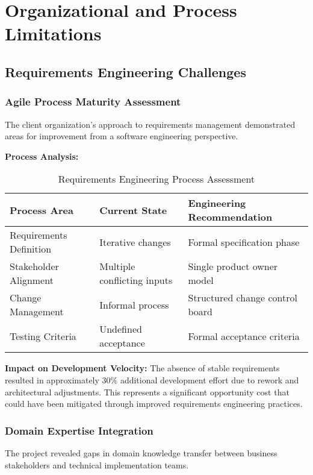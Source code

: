 \section{Organizational and Process Limitations}

\subsection{Requirements Engineering Challenges}

\subsubsection{Agile Process Maturity Assessment}

The client organization's approach to requirements management demonstrated areas for improvement from a software engineering perspective.

\textbf{Process Analysis:}
\begin{table}[h]
\centering
\begin{tabular}{|l|l|l|}
\hline
\textbf{Process Area} & \textbf{Current State} & \textbf{Engineering Recommendation} \\
\hline
Requirements Definition & Iterative changes & Formal specification phase \\
Stakeholder Alignment & Multiple conflicting inputs & Single product owner model \\
Change Management & Informal process & Structured change control board \\
Testing Criteria & Undefined acceptance & Formal acceptance criteria \\
\hline
\end{tabular}
\caption{Requirements Engineering Process Assessment}
\end{table}

\textbf{Impact on Development Velocity:}
The absence of stable requirements resulted in approximately 30\% additional development effort due to rework and architectural adjustments. This represents a significant opportunity cost that could have been mitigated through improved requirements engineering practices.

\subsubsection{Domain Expertise Integration}

The project revealed gaps in domain knowledge transfer between business stakeholders and technical implementation teams.

